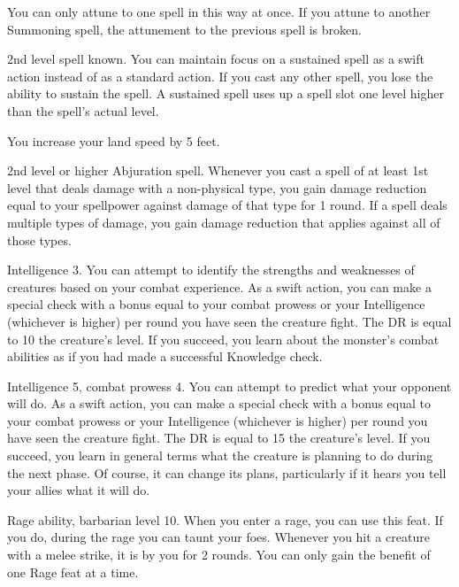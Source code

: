 You can only attune to one spell in this way at once.
If you attune to another Summoning spell, the attunement to the previous spell is broken.

\featpre 2nd level spell known.
\featben You can maintain focus on a sustained spell as a swift action instead of as a standard action.
If you cast any other spell, you lose the ability to sustain the spell.
A sustained spell uses up a spell slot one level higher than the spell's actual level.

\featben You increase your land speed by 5 feet.

\featpre 2nd level or higher Abjuration spell.
\featben Whenever you cast a spell of at least 1st level that deals damage with a non-physical type, you gain damage reduction equal to your spellpower against damage of that type for 1 round.
If a spell deals multiple types of damage, you gain damage reduction that applies against all of those types.

\featpre Intelligence 3.
\featben You can attempt to identify the strengths and weaknesses of creatures based on your combat experience.
As a swift action, you can make a special check with a bonus equal to your combat prowess or your Intelligence (whichever is higher)  per round you have seen the creature fight.
The DR is equal to 10 \add the creature's level.
If you succeed, you learn about the monster's combat abilities as if you had made a successful Knowledge check.

\featpres Intelligence 5, combat prowess 4.
\featben You can attempt to predict what your opponent will do.
As a swift action, you can make a special check with a bonus equal to your combat prowess or your Intelligence (whichever is higher)  per round you have seen the creature fight.
The DR is equal to 15 \add the creature's level.
If you succeed, you learn in general terms what the creature is planning to do during the next phase.
Of course, it can change its plans, particularly if it hears you tell your allies what it will do.

\featpre Rage ability, barbarian level 10.
\featben When you enter a rage, you can use this feat. If you do, during the rage you can taunt your foes.
Whenever you hit a creature with a melee strike, it is \taunted by you for 2 rounds.
 You can only gain the benefit of one Rage feat at a time.

